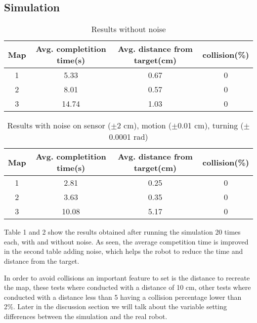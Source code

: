 \subsection{Simulation}
\begin{table}[h]
\begin{center}
	\begin{tabular}{ |c|c|c|c| }
		\hline
		Map & \multicolumn{1}{|p{3cm}|}{\centering Avg. completition time(s) } &\multicolumn{1}{|p{3cm}|}{\centering Avg. distance from target(cm) }  & collision(\%)  \\ 
		\hline
		\hline
		1 & 5.33 & 0.67 & 0 \\  
		2 & 8.01 & 0.57 & 0 \\ 
		3 & 14.74 & 1.03 & 0 \\ 
		\hline 
	\end{tabular}
	\caption{Results without noise}
	\label{table:nonoise}
\end{center}
\end{table}

\begin{table}[h]
\begin{center}
	\begin{tabular}{ |c|c|c|c| }
		\hline
		Map & \multicolumn{1}{|p{3cm}|}{\centering Avg. completition time(s) } &\multicolumn{1}{|p{3cm}|}{\centering Avg. distance from target(cm) }  & collision(\%)  \\ 
		\hline
		\hline
		1 & 2.81 & 0.25  & 0 \\  
		2 & 3.63 & 0.35  & 0 \\ 
		3 & 10.08 & 5.17  & 0 \\ 
		\hline 
	\end{tabular}
	\label{table:noise}
	\caption{Results with noise on sensor ($\pm$2 cm), motion ($\pm$0.01 cm), turning ($\pm$0.0001 rad)}
\end{center}
\end{table}

Table 1 and 2 show the results obtained after running the simulation 20 times each, with and without noise. As seen, the average competition time is improved in the second table adding noise, which helps the robot to reduce the time and distance from the target. 

In order to avoid collisions an important feature to set is the distance to recreate the map, these tests where conducted with a distance of 10 cm, other tests where conducted with a distance less than 5 having a collision percentage lower than 2\%. Later in the discussion section we will talk about the variable setting differences between the simulation and the real robot. 

\FloatBarrier